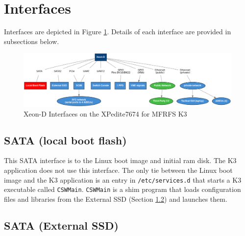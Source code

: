 \documentclass[12pt]{article}
\begin{document}
\section{Interfaces}

Interfaces are depicted in Figure \ref{fig:inteface}.  Details of each
interface are provided in subsections below.

\begin{figure}[H]
\begin{center}
\includegraphics[width=1.0\textwidth]{img/interface}
\caption{Xeon-D Interfaces on the XPedite7674 for MFRFS K3}
\label{fig:inteface}
\end{center}
\end{figure}



\subsection{SATA (local boot flash)}
\label{section:sata}

This SATA interface is to the Linux boot image and initial ram disk.
The K3 application does not use this interface.
The only tie between the Linux boot image and the K3 application is 
an entry in \texttt{/etc/services.d} that starts a K3 executable called
\texttt{CSWMain}.
\texttt{CSWMain} is a shim program that loads configuration files
and libraries from the External SSD (Section \ref{section:sata2}) and
launches them.



\subsection{SATA (External SSD)}
\label{section:sata2}
\end{document}
